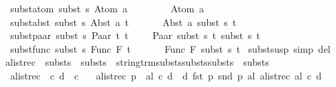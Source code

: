 \begin{isabellebody}
\ \ subst{\isacharunderscore}{\kern0pt}atom{\isacharcolon}{\kern0pt}\ {\isachardoublequoteopen}subst\ s\ {\isacharparenleft}{\kern0pt}Atom\ a{\isacharparenright}{\kern0pt}\ \ \ \ \ \ \ \ {\isacharequal}{\kern0pt}\ Atom\ a{\isachardoublequoteclose}\ {\isacharbar}{\kern0pt}\isanewline
\ \ subst{\isacharunderscore}{\kern0pt}abst{\isacharcolon}{\kern0pt}\ {\isachardoublequoteopen}subst\ s\ {\isacharparenleft}{\kern0pt}Abst\ a\ t{\isacharparenright}{\kern0pt}\ \ \ \ \ \ {\isacharequal}{\kern0pt}\ Abst\ a\ {\isacharparenleft}{\kern0pt}subst\ s\ t{\isacharparenright}{\kern0pt}{\isachardoublequoteclose}\ {\isacharbar}{\kern0pt}\isanewline
\ \ subst{\isacharunderscore}{\kern0pt}paar{\isacharcolon}{\kern0pt}\ {\isachardoublequoteopen}subst\ s\ {\isacharparenleft}{\kern0pt}Paar\ t{}\ t{}{\isacharparenright}{\kern0pt}\ \ \ \ {\isacharequal}{\kern0pt}\ Paar\ {\isacharparenleft}{\kern0pt}subst\ s\ t{}{\isacharparenright}{\kern0pt}\ {\isacharparenleft}{\kern0pt}subst\ s\ t{}{\isacharparenright}{\kern0pt}{\isachardoublequoteclose}\ {\isacharbar}{\kern0pt}\isanewline
\ \ subst{\isacharunderscore}{\kern0pt}func{\isacharcolon}{\kern0pt}\ {\isachardoublequoteopen}subst\ s\ {\isacharparenleft}{\kern0pt}Func\ F\ t{\isacharparenright}{\kern0pt}\ \ \ \ \ \ {\isacharequal}{\kern0pt}\ Func\ F\ {\isacharparenleft}{\kern0pt}subst\ s\ t{\isacharparenright}{\kern0pt}{\isachardoublequoteclose}\isanewline
\isanewline
{}\isamarkupfalse%
\ subst{\isacharunderscore}{\kern0pt}susp\ {\isacharbrackleft}{\kern0pt}simp\ del{\isacharbrackright}{\kern0pt}\isanewline
\isanewline
\isanewline
\isanewline
{}\isamarkupfalse%
\ alist{\isacharunderscore}{\kern0pt}rec\ {\isacharcolon}{\kern0pt}{\isacharcolon}{\kern0pt}\ {\isachardoublequoteopen}substs\ {\isasymRightarrow}\ substs\ {\isasymRightarrow}\ {\isacharparenleft}{\kern0pt}string{\isasymRightarrow}trm{\isasymRightarrow}substs{\isasymRightarrow}substs{\isasymRightarrow}substs{\isacharparenright}{\kern0pt}\ {\isasymRightarrow}\ substs{\isachardoublequoteclose}\ \isanewline
\ \ {\isachardoublequoteopen}alist{\isacharunderscore}{\kern0pt}rec\ {\isacharbrackleft}{\kern0pt}{\isacharbrackright}{\kern0pt}\ c\ d\ {\isacharequal}{\kern0pt}\ c{\isachardoublequoteclose}\ {\isacharbar}{\kern0pt}\isanewline
\ \ {\isachardoublequoteopen}alist{\isacharunderscore}{\kern0pt}rec\ {\isacharparenleft}{\kern0pt}p\ {\isacharhash}{\kern0pt}\ al{\isacharparenright}{\kern0pt}\ c\ d\ {\isacharequal}{\kern0pt}\ d\ {\isacharparenleft}{\kern0pt}fst\ p{\isacharparenright}{\kern0pt}\ {\isacharparenleft}{\kern0pt}snd\ p{\isacharparenright}{\kern0pt}\ al\ {\isacharparenleft}{\kern0pt}alist{\isacharunderscore}{\kern0pt}rec\ al\ c\ d{\isacharparenright}{\kern0pt}{\isachardoublequoteclose}\isanewline

\end{isabellebody}
